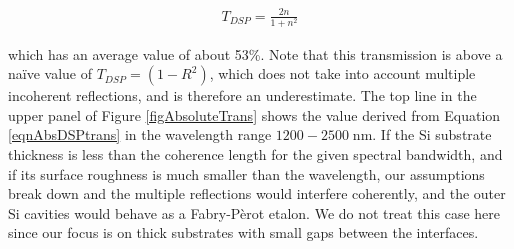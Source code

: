 \begin{eqnarray}
T_{DSP} = \frac{2n}{1+n^2} \label{eqnAbsDSPtrans}
\end{eqnarray}

which has an average value of about 53\%.  Note that this transmission is above a na\"ive value of $T_{DSP}=(1-R^2)$, which does not take into account multiple incoherent reflections, and is therefore an underestimate.  The top line in the upper panel of Figure \ref{figAbsoluteTrans} shows the value derived from Equation \ref{eqnAbsDSPtrans} in the wavelength range $1200-2500\;$nm.  If the Si substrate thickness is less than the coherence length for the given spectral bandwidth, and if its surface roughness is much smaller than the wavelength, our assumptions break down and the multiple reflections would interfere coherently, and the outer Si cavities would behave as a Fabry-P\`erot etalon.  We do not treat this case here since our focus is on thick substrates with small gaps between the interfaces.


